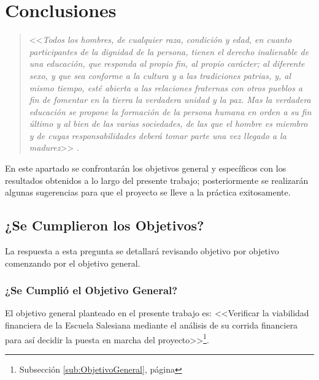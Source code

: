 \chapter*{Conclusiones}
\label{ch:Conclusiones}

\begin{quote}
<<\textit{Todos los hombres, de cualquier raza, condición y edad, en cuanto participantes de la dignidad de la persona, tienen el derecho inalienable de una educación, que responda al propio fin, al propio carácter; al diferente sexo, y que sea conforme a la cultura y a las tradiciones patrias, y, al mismo tiempo, esté abierta a las relaciones fraternas con otros pueblos a fin de fomentar en la tierra la verdadera unidad y la paz. Mas la verdadera educación se propone la formación de la persona humana en orden a su fin último y al bien de las varias sociedades, de las que el hombre es miembro y de cuyas responsabilidades deberá tomar parte una vez llegado a la madurez}>> \citep{GRED1965}.
\end{quote}

En este apartado se confrontarán los objetivos general y específicos con los resultados obtenidos a lo largo del presente trabajo; posteriormente se realizarán algunas sugerencias para que el proyecto se lleve a la práctica exitosamente.

\pagebreak
\section*{¿Se Cumplieron los Objetivos?}

La respuesta a esta pregunta se detallará revisando objetivo por objetivo comenzando por el objetivo general.

\subsection*{¿Se Cumplió el Objetivo General?}


El objetivo general planteado en el presente trabajo es: <<Verificar la viabilidad financiera de la Escuela Salesiana mediante el análisis de su corrida financiera para así decidir la puesta en marcha del proyecto>>\footnote{Subsección \ref{sub:ObjetivoGeneral}, página \pageref{sub:ObjetivoGeneral}}.

